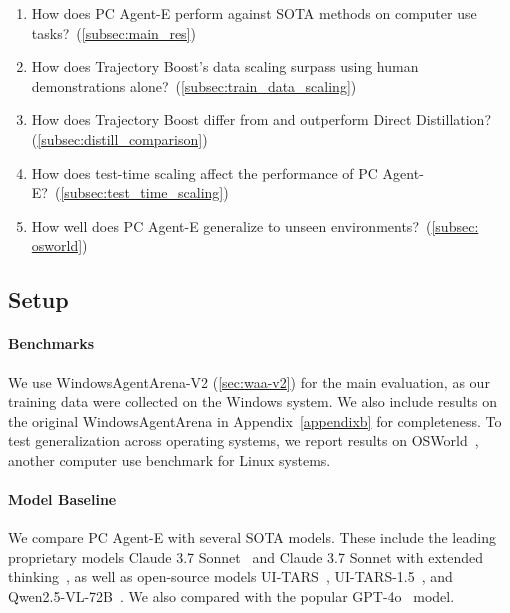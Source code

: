 \documentclass{article} %
\renewcommand{\cite}{\citep}
\begin{document}
\begin{enumerate}
    \item How does PC Agent-E perform against SOTA methods on computer use tasks?~(\autoref{subsec:main_res})
    \item How does Trajectory Boost's data scaling surpass using human demonstrations alone?~(\autoref{subsec:train_data_scaling})
    \item How does Trajectory Boost differ from and outperform Direct Distillation? (\autoref{subsec:distill_comparison})
    \item How does test-time scaling affect the performance of PC Agent-E?~(\autoref{subsec:test_time_scaling})
    \item How well does PC Agent-E generalize to unseen environments?~(\autoref{subsec: osworld})
\end{enumerate}



\subsection{Setup}
\label{sec: setup}

\paragraph{Benchmarks}

We use WindowsAgentArena-V2 (\autoref{sec:waa-v2}) for the main evaluation, as our training data were collected on the Windows system. We also include results on the original WindowsAgentArena \cite{bonatti2024windowsagentarenaevaluating} in Appendix~\ref{appendixb} for completeness. To test generalization across operating systems, we report results on OSWorld~\cite{xie2024osworldbenchmarkingmultimodalagents}, another computer use benchmark for Linux systems.

\paragraph{Model Baseline}

We compare PC Agent-E with several SOTA models. These include the leading proprietary models Claude 3.7 Sonnet~\cite{2025claude37} and Claude 3.7 Sonnet with extended thinking~\cite{2025claudethinking}, as well as open-source models UI-TARS~\cite{uitars2025}, UI-TARS-1.5~\cite{seedtars2025}, and Qwen2.5-VL-72B~\cite{bai2025qwen25vltechnicalreport}. We also compared with the popular GPT-4o~\cite{openai2024gpt4o} model.
\end{document}
